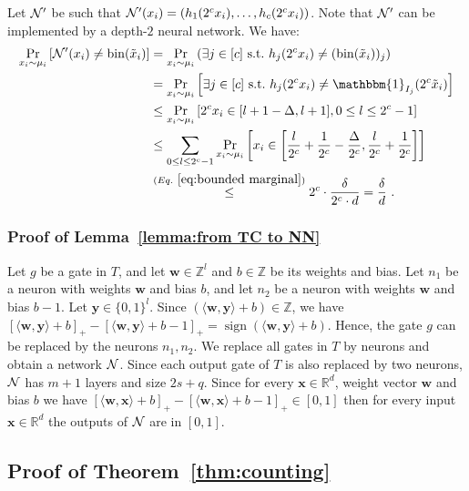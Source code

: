 \documentclass[11pt]{article}
\newcommand{\onefunc}{\mathbbm{1}}
\newcommand{\bx}{\mathbf{x}}
\newcommand{\bw}{\mathbf{w}}
\newcommand{\by}{\mathbf{y}}
\newcommand{\cn}{{\cal N}}
\DeclareMathOperator*{\sign}{sign}
\newcommand{\reals}{{\mathbb R}}
\newcommand{\integers}{{\mathbb Z}}
\DeclareMathOperator{\bin}{bin}
\newcommand{\inner}[1]{\langle #1 \rangle}
\newcommand{\tx}{{\tilde{x}}}
\begin{document}
Let $\cn'$ be such that $\cn'(x_i)=\left(h_1(2^c x_i),\ldots,h_{c}(2^c x_i)\right)$.
Note that $\cn'$ can be implemented by a depth-$2$ neural network.
%
We have:
\begin{align*}
	\Pr_{x_i \sim \mu_i}\left[\cn'(x_i) \neq \bin(\tx_i) \right]
	&= \Pr_{x_i \sim \mu_i}\left(\exists j \in [c] \text{\ s.t.\ } h_j(2^c x_i) \neq (\bin(\tx_i))_j \right)
	\\
	&=\Pr_{x_i \sim \mu_i}\left[\exists j \in [c] \text{\ s.t.\ } h_j(2^c x_i) \neq \onefunc_{I_j}(2^c \tx_i) \right]
	\\
	&\leq \Pr_{x_i \sim \mu_i}\left[ 2^c x_i \in[l + 1-\Delta,l+1], 0 \leq l \leq 2^c - 1 \right]
	\\
	&\leq \sum_{0 \leq l \leq 2^c - 1} \Pr_{x_i \sim \mu_i}\left[x_i \in \left[\frac{l}{2^c}+\frac{1}{2^c}-\frac{\Delta}{2^c}, \frac{l}{2^c}+\frac{1}{2^c}\right] \right]
	\\
	&\stackrel{(Eq.~\ref{eq:bounded marginal})}{\leq} 2^c \cdot \frac{\delta}{2^c \cdot d}
	= \frac{\delta}{d}~.
\end{align*}



\subsubsection{Proof of Lemma~\ref{lemma:from TC to NN}}
\label{sec:proof of lemma from TC to NN}

Let $g$ be a gate in $T$, and let $\bw \in \integers^l$ and $b \in \integers$ be its weights and bias. Let $n_1$ be a neuron with weights $\bw$ and bias $b$, and let $n_2$ be a neuron with weights $\bw$ and bias $b-1$. Let $\by \in \{0,1\}^l$. Since $(\inner{\bw,\by}+b) \in \integers$, we have $[\inner{\bw,\by}+b]_+ - [\inner{\bw,\by}+b-1]_+ = \sign(\inner{\bw,\by} + b)$. Hence, the gate $g$ can be replaced by the neurons $n_1,n_2$. We replace all gates in $T$ by neurons and obtain a network $\cn$. Since each output gate of $T$ is also replaced by two neurons, $\cn$ has $m+1$ layers 
and size $2s+q$.
Since for every $\bx \in \reals^d$, weight vector $\bw$ and bias $b$ we have $[\inner{\bw,\bx}+b]_+ - [\inner{\bw,\bx}+b-1]_+ \in [0,1]$ then for every input $\bx \in \reals^d$ the outputs of $\cn$ are in $[0,1]$.

\subsection{Proof of Theorem~\ref{thm:counting}}
\label{app:proof of theorem counting}
\end{document}
